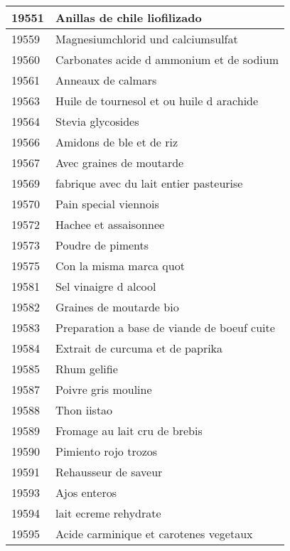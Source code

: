 \begin{longtable}{|l|l|}
19551 & Anillas de chile liofilizado \\ \hline 
19559 & Magnesiumchlorid und calciumsulfat \\ \hline 
19560 & Carbonates acide d ammonium et de sodium \\ \hline 
19561 & Anneaux de calmars \\ \hline 
19563 & Huile de tournesol et ou huile d arachide \\ \hline 
19564 & Stevia glycosides \\ \hline 
19566 & Amidons de ble et de riz \\ \hline 
19567 & Avec graines de moutarde \\ \hline 
19569 & fabrique avec du lait entier pasteurise \\ \hline 
19570 & Pain special viennois \\ \hline 
19572 & Hachee et assaisonnee \\ \hline 
19573 & Poudre de piments \\ \hline 
19575 & Con la misma marca quot \\ \hline 
19581 & Sel vinaigre d alcool \\ \hline 
19582 & Graines de moutarde bio \\ \hline 
19583 & Preparation a base de viande de boeuf cuite \\ \hline 
19584 & Extrait de curcuma et de paprika \\ \hline 
19585 & Rhum gelifie \\ \hline 
19587 & Poivre gris mouline \\ \hline 
19588 & Thon iistao \\ \hline 
19589 & Fromage au lait cru de brebis \\ \hline 
19590 & Pimiento rojo trozos \\ \hline 
19591 & Rehausseur de saveur \\ \hline 
19593 & Ajos enteros \\ \hline 
19594 & lait ecreme rehydrate \\ \hline 
19595 & Acide carminique et carotenes vegetaux \\ \hline 
 \end{longtable}
